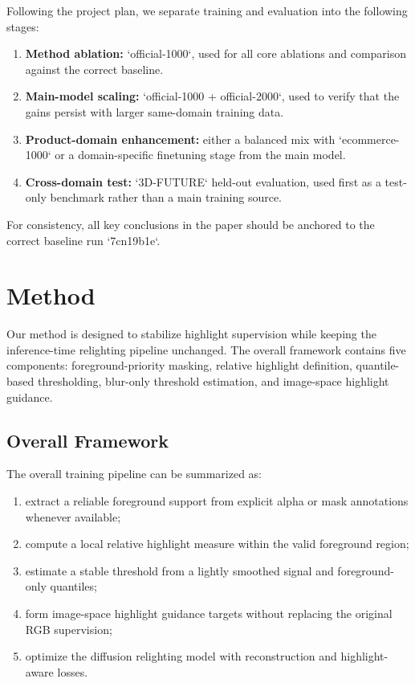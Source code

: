 \documentclass[UTF8,a4paper]{ctexart}
\begin{document}
Following the project plan, we separate training and evaluation into the following stages:

\begin{enumerate}
\item \textbf{Method ablation:} `official-1000`, used for all core ablations and comparison against the correct baseline.
\item \textbf{Main-model scaling:} `official-1000 + official-2000`, used to verify that the gains persist with larger same-domain training data.
\item \textbf{Product-domain enhancement:} either a balanced mix with `ecommerce-1000` or a domain-specific finetuning stage from the main model.
\item \textbf{Cross-domain test:} `3D-FUTURE` held-out evaluation, used first as a test-only benchmark rather than a main training source.
\end{enumerate}

For consistency, all key conclusions in the paper should be anchored to the correct baseline run `7cn19b1e`.

\section{Method}

Our method is designed to stabilize highlight supervision while keeping the inference-time relighting pipeline unchanged. The overall framework contains five components: foreground-priority masking, relative highlight definition, quantile-based thresholding, blur-only threshold estimation, and image-space highlight guidance.

\subsection{Overall Framework}

The overall training pipeline can be summarized as:

\begin{enumerate}
\item extract a reliable foreground support from explicit alpha or mask annotations whenever available;
\item compute a local relative highlight measure within the valid foreground region;
\item estimate a stable threshold from a lightly smoothed signal and foreground-only quantiles;
\item form image-space highlight guidance targets without replacing the original RGB supervision;
\item optimize the diffusion relighting model with reconstruction and highlight-aware losses.
\end{enumerate}
\end{document}
